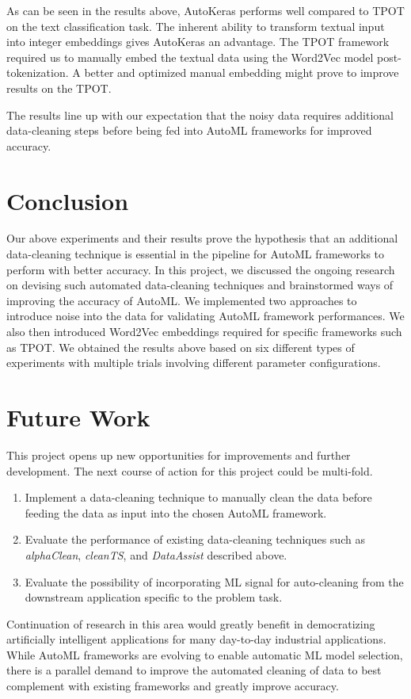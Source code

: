 \documentclass{article}
\begin{document}
As can be seen in the results above, AutoKeras performs well compared to TPOT on the text classification task. The inherent ability to transform textual input into integer embeddings gives AutoKeras an advantage. The TPOT framework required us to manually embed the textual data using the Word2Vec model post-tokenization. A better and optimized manual embedding might prove to improve results on the TPOT. 

The results line up with our expectation that the noisy data requires additional data-cleaning steps before being fed into AutoML frameworks for improved accuracy. 

\section{Conclusion}
Our above experiments and their results prove the hypothesis that an additional data-cleaning technique is essential in the pipeline for AutoML frameworks to perform with better accuracy. In this project, we discussed the ongoing research on devising such automated data-cleaning techniques and brainstormed ways of improving the accuracy of AutoML. We implemented two approaches to introduce noise into the data for validating AutoML framework performances. We also then introduced Word2Vec embeddings required for specific frameworks such as TPOT. We obtained the results above based on six different types of experiments with multiple trials involving different parameter configurations. 

\section{Future Work}
This project opens up new opportunities for improvements and further development. The next course of action for this project could be multi-fold. 
\begin{enumerate}
    \item Implement a data-cleaning technique to manually clean the data before feeding the data as input into the chosen AutoML framework.
    \item Evaluate the performance of existing data-cleaning techniques such as \textit{alphaClean}, \textit{cleanTS}, and \textit{DataAssist} described above. 
    \item Evaluate the possibility of incorporating ML signal for auto-cleaning from the downstream application specific to the problem task.
\end{enumerate}

Continuation of research in this area would greatly benefit in democratizing artificially intelligent applications for many day-to-day industrial applications. While AutoML frameworks are evolving to enable automatic ML model selection, there is a parallel demand to improve the automated cleaning of data to best complement with existing frameworks and greatly improve accuracy. 


% 


\clearpage
\end{document}

